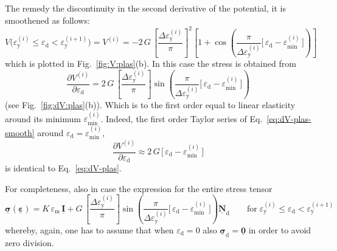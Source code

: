\documentclass[times,namecite]{goose-article}
\newcommand\T[1]{\underline{\bm{{#1}}}}
\begin{document}
The remedy the discontinuity in the second derivative of the potential, it is smoothened as follows:
\begin{equation}
    \label{eq:V-plas-smooth}
    V \big(
      \varepsilon_\mathrm{y}^{(i)} \leq \varepsilon_\mathrm{d} < \varepsilon_\mathrm{y}^{(i+1)}
    \big)
    =
    V^{(i)}
    =
    - 2 \, G \,
    \left[ \frac{\Delta \varepsilon_\mathrm{y}^{(i)}}{\pi} \right]^2
    \left[
      1
      +
      \cos \left(
        \frac{ \pi }{ \Delta \varepsilon_\mathrm{y}^{(i)} }
        \Big[\, \varepsilon_\mathrm{d} - \varepsilon_\mathrm{min}^{(i)} \,\Big]
      \right)
    \right]
\end{equation}
which is plotted in Fig.~\ref{fig:V:plas}(b). In this case the stress is obtained from
\begin{equation}
    \label{eq:dV-plas-smooth}
    \frac{\partial V^{(i)}}{\partial \varepsilon_\mathrm{d}}
    =
    2 \, G \,
    \left[ \frac{\Delta \varepsilon_\mathrm{y}^{(i)}}{\pi} \right]
    \sin \left(
      \frac{ \pi }{ \Delta \varepsilon_\mathrm{y}^{(i)} }
      \Big[\, \varepsilon_\mathrm{d} - \varepsilon_\mathrm{min}^{(i)} \,\Big]
    \right)
\end{equation}
(see Fig.~\ref{fig:dV:plas}(b)). Which is to the first order equal to linear elasticity around its minimum $\varepsilon_\mathrm{min}^{(i)}$. Indeed, the first order Taylor series of Eq.~\eqref{eq:dV-plas-smooth} around $\varepsilon_\mathrm{d} = \varepsilon_\mathrm{min}^{(i)}$,
\begin{equation}
    \frac{\partial V^{(i)}}{\partial \varepsilon_\mathrm{d}}
    \approx
    2 \, G \, \Big[\, \varepsilon_\mathrm{d} - \varepsilon_\mathrm{min}^{(i)} \,\Big]
\end{equation}
is identical to Eq.~\eqref{eq:dV-plas}.

For completeness, also in case the expression for the entire stress tensor
\begin{equation}
    \T{\sigma} ( \T{\varepsilon} )
    =
    K \, \varepsilon_\mathrm{m} \, \T{I}
    +
    G \,
    \left[ \frac{\Delta \varepsilon_\mathrm{y}^{(i)}}{\pi} \right]
    \sin \left(
      \frac{ \pi }{ \Delta \varepsilon_\mathrm{y}^{(i)} }
      \Big[\, \varepsilon_\mathrm{d} - \varepsilon_\mathrm{min}^{(i)} \,\Big]
    \right)
    \T{N}_\mathrm{d}
    \qquad
    \mathrm{for}
    \;
    \varepsilon_\mathrm{y}^{(i)} \leq \varepsilon_\mathrm{d} < \varepsilon_\mathrm{y}^{(i+1)}
\end{equation}
whereby, again, one has to assume that when $\varepsilon_\mathrm{d} = 0$ also $\T{\sigma}_\mathrm{d} = \T{0}$ in order to avoid zero division.
\end{document}
